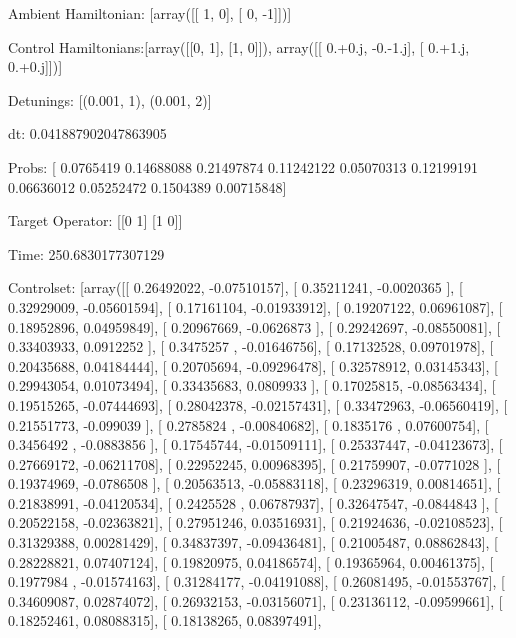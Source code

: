 \documentclass{article}
\begin{document}
    

\newpage

Ambient Hamiltonian: [array([[ 1,  0],
       [ 0, -1]])]

Control Hamiltonians:[array([[0, 1],
       [1, 0]]), array([[ 0.+0.j, -0.-1.j],
       [ 0.+1.j,  0.+0.j]])]

Detunings: [(0.001, 1), (0.001, 2)]

 dt: 0.041887902047863905

Probs: [ 0.0765419   0.14688088  0.21497874  0.11242122  0.05070313  0.12199191
  0.06636012  0.05252472  0.1504389   0.00715848]

Target Operator: [[0 1]
 [1 0]]

Time: 250.6830177307129

Controlset: [array([[ 0.26492022, -0.07510157],
       [ 0.35211241, -0.0020365 ],
       [ 0.32929009, -0.05601594],
       [ 0.17161104, -0.01933912],
       [ 0.19207122,  0.06961087],
       [ 0.18952896,  0.04959849],
       [ 0.20967669, -0.0626873 ],
       [ 0.29242697, -0.08550081],
       [ 0.33403933,  0.0912252 ],
       [ 0.3475257 , -0.01646756],
       [ 0.17132528,  0.09701978],
       [ 0.20435688,  0.04184444],
       [ 0.20705694, -0.09296478],
       [ 0.32578912,  0.03145343],
       [ 0.29943054,  0.01073494],
       [ 0.33435683,  0.0809933 ],
       [ 0.17025815, -0.08563434],
       [ 0.19515265, -0.07444693],
       [ 0.28042378, -0.02157431],
       [ 0.33472963, -0.06560419],
       [ 0.21551773, -0.099039  ],
       [ 0.2785824 , -0.00840682],
       [ 0.1835176 ,  0.07600754],
       [ 0.3456492 , -0.0883856 ],
       [ 0.17545744, -0.01509111],
       [ 0.25337447, -0.04123673],
       [ 0.27669172, -0.06211708],
       [ 0.22952245,  0.00968395],
       [ 0.21759907, -0.0771028 ],
       [ 0.19374969, -0.0786508 ],
       [ 0.20563513, -0.05883118],
       [ 0.23296319,  0.00814651],
       [ 0.21838991, -0.04120534],
       [ 0.2425528 ,  0.06787937],
       [ 0.32647547, -0.0844843 ],
       [ 0.20522158, -0.02363821],
       [ 0.27951246,  0.03516931],
       [ 0.21924636, -0.02108523],
       [ 0.31329388,  0.00281429],
       [ 0.34837397, -0.09436481],
       [ 0.21005487,  0.08862843],
       [ 0.28228821,  0.07407124],
       [ 0.19820975,  0.04186574],
       [ 0.19365964,  0.00461375],
       [ 0.1977984 , -0.01574163],
       [ 0.31284177, -0.04191088],
       [ 0.26081495, -0.01553767],
       [ 0.34609087,  0.02874072],
       [ 0.26932153, -0.03156071],
       [ 0.23136112, -0.09599661],
       [ 0.18252461,  0.08088315],
       [ 0.18138265,  0.08397491],
\end{document}
